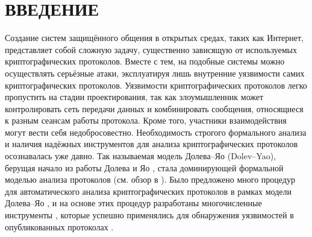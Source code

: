\section{ВВЕДЕНИЕ}

Создание систем защищённого общения в открытых средах, таких как Интернет, представляет собой сложную задачу, существенно
зависящую от используемых криптографических протоколов. Вместе с тем, на подобные системы можно осуществлять серьёзные атаки,
эксплуатируя лишь внутренние уязвимости самих криптографических протоколов. Уязвимости криптографических протоколов легко
пропустить на стадии проектирования, так как злоумышленник может контролировать сеть передачи данных и комбинировать сообщения,
относящиеся к разным сеансам работы протокола. Кроме того, участники взаимодействия могут вести себя недобросовестно. Необходимость
строгого формального анализа и наличия надёжных инструментов для анализа криптографических протоколов осознавалась
уже давно. Так называемая модель Долева–Яо (Dolev–Yao), берущая начало из работы Долева и Яо \cite{DolevYao1983}, стала
доминирующей формальной моделью анализа протоколов (см. обзор в \cite{Meadows2000}). Было предложено много процедур для автоматического
анализа криптографических протоколов в рамках модели Долева–Яо \cite{Amadio2002}, и на основе этих процедур разработаны многочисленные инструменты \cite{MillenShmatikov2001}, которые успешно применялись для обнаружения уязвимостей в опубликованных протоколах \cite{ClarkJacob1997}.

